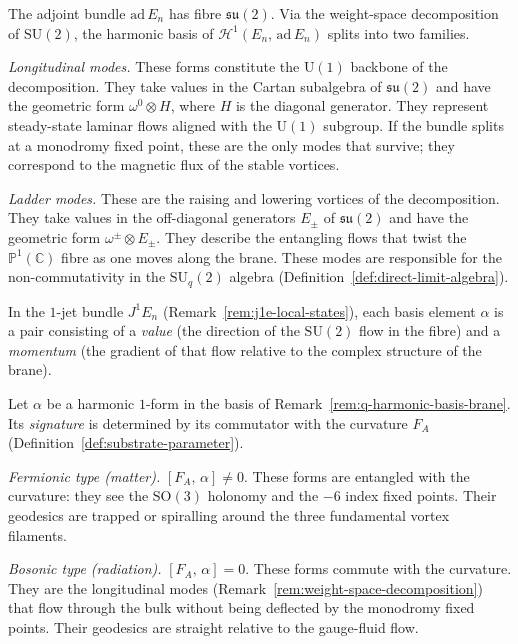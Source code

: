 
\begin{remark}
\label{rem:weight-space-decomposition}
The adjoint bundle $\mathrm{ad}\, E_n$ has fibre $\mathfrak{su}(2)$.  Via the
weight-space decomposition of $\mathrm{SU}(2)$, the harmonic basis of
$\mathcal{H}^1(E_n,\, \mathrm{ad}\, E_n)$ splits into two families.

\emph{Longitudinal modes.}
These forms constitute the $\mathrm{U}(1)$ backbone of the decomposition.
They take values in the Cartan subalgebra of $\mathfrak{su}(2)$ and have the
geometric form $\omega^0 \otimes H$, where $H$ is the diagonal generator.
They represent steady-state laminar flows aligned with the $\mathrm{U}(1)$
subgroup.  If the bundle splits at a monodromy fixed point, these are the only
modes that survive; they correspond to the magnetic flux of the stable
vortices.

\emph{Ladder modes.}
These are the raising and lowering vortices of the decomposition.  They take
values in the off-diagonal generators $E_\pm$ of $\mathfrak{su}(2)$ and have
the geometric form $\omega^\pm \otimes E_\pm$.  They describe the entangling
flows that twist the $\mathbb{P}^1(\mathbb{C})$ fibre as one moves along the brane.
These modes are responsible for the non-commutativity in the
$\mathrm{SU}_q(2)$ algebra (Definition~\ref{def:direct-limit-algebra}).

In the $1$-jet bundle $J^1 E_n$
(Remark~\ref{rem:j1e-local-states}), each basis element $\alpha$ is a pair
consisting of a \emph{value} (the direction of the $\mathrm{SU}(2)$ flow in
the fibre) and a \emph{momentum} (the gradient of that flow relative to the
complex structure of the brane).
\end{remark}


\begin{remark}
\label{rem:algebraic-filter}
Let $\alpha$ be a harmonic $1$-form in the basis of
Remark~\ref{rem:q-harmonic-basis-brane}.  Its \emph{signature} is determined
by its commutator with the curvature $F_A$
(Definition~\ref{def:substrate-parameter}).

\emph{Fermionic type (matter).}
$[F_A,\, \alpha] \neq 0$.  These forms are entangled with the curvature: they
see the $\mathrm{SO}(3)$ holonomy and the $-6$ index fixed points.  Their
geodesics are trapped or spiralling around the three fundamental vortex
filaments.

\emph{Bosonic type (radiation).}
$[F_A,\, \alpha] = 0$.  These forms commute with the curvature.  They are the
longitudinal modes (Remark~\ref{rem:weight-space-decomposition}) that flow
through the bulk without being deflected by the monodromy fixed points.  Their
geodesics are straight relative to the gauge-fluid flow.
\end{remark}

